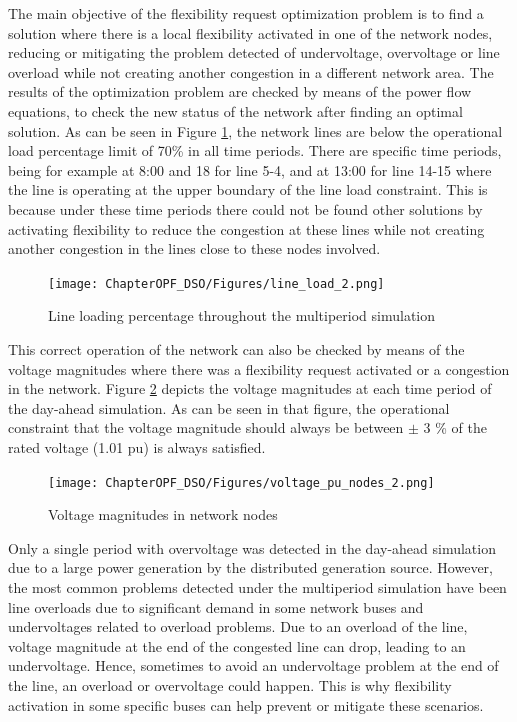 The main objective of the flexibility request optimization problem is to find a solution where there is a local flexibility activated in one of the network nodes, reducing or mitigating the problem detected of undervoltage, overvoltage or line overload while not creating another congestion in a different network area. 
The results of the optimization problem are checked by means of the power flow equations, to check the new status of the network after finding an optimal solution. As can be seen in Figure \ref{fig:line_load}, the network lines are below the operational load percentage limit of 70\% in all time periods. There are specific time periods, being for example at 8:00 and 18 for line 5-4, and at 13:00 for line 14-15 where the line is operating at the upper boundary of the line load constraint. This is because under these time periods there could not be found other solutions by activating flexibility to reduce the congestion at these lines while not creating another congestion in the lines close to these nodes involved. 

\begin{figure}[htbp]
	\centering
	\texttt{[image: ChapterOPF\_DSO/Figures/line\_load\_2.png]}
	\caption{Line loading percentage throughout the multiperiod simulation}
	\label{fig:line_load}  
\end{figure}

This correct operation of the network can also be checked by means of the voltage magnitudes where there was a flexibility request activated or a congestion in the network. Figure \ref{fig:voltage_magnitudes} depicts the voltage magnitudes at each time period of the day-ahead simulation. As  can be seen in that figure, the operational constraint that the voltage magnitude should always be between $\pm$ 3 \% of the rated voltage (1.01 pu) is always satisfied.
 
\begin{figure}[htbp]
	\centering
	\texttt{[image: ChapterOPF\_DSO/Figures/voltage\_pu\_nodes\_2.png]}
	\caption{Voltage magnitudes in network nodes}
	\label{fig:voltage_magnitudes}  
\end{figure}

Only a single period with overvoltage was detected in the day-ahead simulation due to a large power generation by the distributed generation source. However, the most common problems detected under the multiperiod simulation have been line overloads due to significant demand in some network buses and undervoltages related to overload problems. Due to an overload of the line, voltage magnitude at the end of the congested line can drop, leading to an undervoltage. Hence, sometimes to avoid an undervoltage problem at the end of the line, an overload or overvoltage could happen. This is why flexibility activation in some specific buses can help prevent or mitigate these scenarios. 

